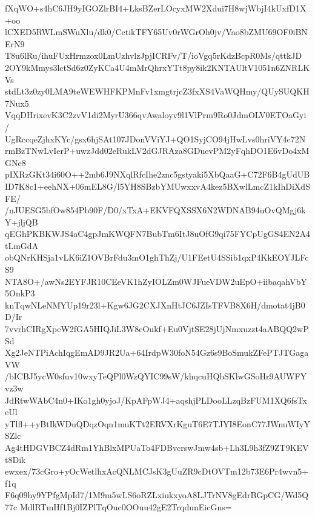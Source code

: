 fXqWO+s4hC6JH9yIGOZlrBI4+LksBZerLOcyxMW2Xdui7H8wjWbjI4kUxfD1X+oo
lCXED5RWLmSWuXlu/dk0/CctikTFY65Uv0rWGrOh0jv/Vao8bZMU69OF0iBNErN9
T8u6lRu/ihuFUxHrmzox0LmUzhvlzJpjICRFv/T/ioVgq5rKdzBcpR0Ms/qttkJD
2OY9kMmys3lctSd6z0ZyKCa4U4mMrQhrxYTt8py8ik2KNTAUltV1051n6ZNRLKVs
stdLt3z0zy0LMA9teWEWHFKPMnFv1xmgtrjcZ3fxXS4VaWQHmy/QUySUQKH7Nux5
VqqDHrixevK3C2zvV1di2MyrU366qvAwaloyv9l1VlPrm9Ro0JdmOLV0ETOaGyi/
UgRccqeZjhxKYc/gsx6hjSAt107JDonVViYJ+QO1SyjCO94jHwLvs0hriVY4c72N
rmBzTNwLvIerP+uwzJdd02eRukLV2dGJRAza8GDuevPM2yFqhDO1E6vDo4xMGNe8
pIXRzGKt34i60O++2mb6J9NXqlRfcIhe2znc5gstyaki5XbQaaG+C72F6B4gUdUB
ID7K8c1+eehNX+06mEL8G/l5YH8SBzbYMUwxxvA4kez5BXwlLmcZ1kIhDiXdSFE/
/nJUESG5bfOw854Pb90F/D0/xTxA+EKVFQXSSX6N2WDNAB94uOvQMgj6kY+jljQB
qEGhPKBKWJS4aC4gpJmKWQFN7BubTm6ItJ8uOfG9qi75FYCpUgGS4EN2A4tLmGdA
obQNrKHSja1vLK6iZ1OVBrFdu3mO1ghThZj/U1FEetU4SSib1qxP4KkEOYJLFcS9
NTA8O+/awNs2EYFJR10CEeVK1hZyIOLZm0WJFueVDW2uEpO+iibaqahVbY5OnkP3
knTqwNLeNMYUp19r23l+Kgw6JG2CXJXnHtJC6JZIsTFVB8X6H/dmotat4jB0D/Ir
7vvrhCIRgXpeW2fGA5HIQJiL3W8eOukf+Eu0VjtSE28jUjNmxuzzt4aABQQ2wPSd
Xg2JeNTPiAchIqgEmAD9JR2Ua+64IrdpW30foN54Gz6s9BoSmukZFePTJTGagaVW
/bICBJ5ycW0sfuv10wxyTeQPl0WzQYIC99sW/khqcuHQbSKlwGSoHr9AUWFYvz3w
JdRtwWAbC4n0+IKo1gh0yjoJ/KpAFpWJ4+aqshjPLDooLLzqBzFUM1XQ6fsTxeUl
yTlfl++yBtIkWDuQDqzOqn1muKTt2ERVXrKguT6E7TJYI8EonC77JWnuWIyYSZlc
Ag4tHDGVBCZ4dRm1YhBlxMPUaTo4FDBvcrswJmw4sb+Lh3L9h3fZ9ZT9KEVt8Dik
ewxex/73cGro+yOcWetlhxAcQNLMCJsK3gUuZR9cDtOVTm12b73E6Pr4wvn5+f1q
F6q09hy9YPfgMpId7/1M9m5wLS6oRZLxiukxyoA8LJTrNV8gEdrBGpCG/Wd5Q77c
MdlRTmHf1Bj0IZPlTqOuc0OOuu42gE2TrqdunEicGns=
